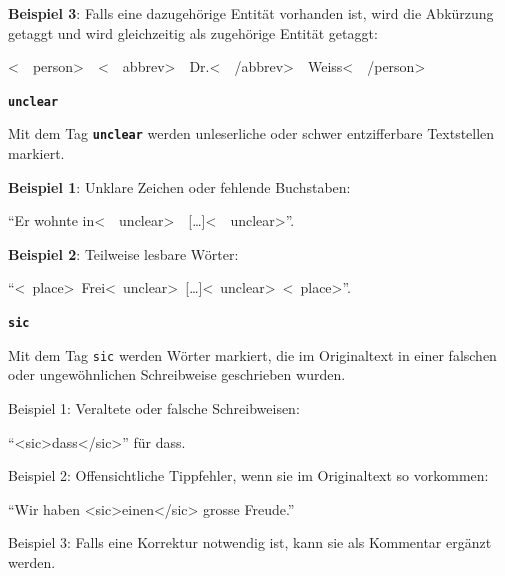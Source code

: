 \documentclass[12pt, a4paper, ngerman, bidi=default]{article}
\begin{document}
\begin{description}
\begin{description}
    \textbf{\textbf{ Beispiel 3}}: Falls eine dazugehörige Entität vorhanden ist, wird die Abkürzung getaggt und wird gleichzeitig als zugehörige Entität getaggt:

    \colorbox{VeryLightGray}{\textless\ \ person\textgreater\ \  \textless\ \  abbrev\textgreater\ \  Dr.\textless\ \  /abbrev\textgreater\ \  Weiss{\textless\ \  /person\textgreater}}
    
    \item\texttt{\textbf{{\colorbox{unclear}{unclear}}}}
    

    Mit dem Tag \texttt{\texttt{\textbf{{\colorbox{unclear}{unclear}}}}} werden unleserliche oder schwer entzifferbare Textstellen markiert.
    
    \noindent\textbf{ Beispiel 1}: Unklare Zeichen oder fehlende Buchstaben: 

    \colorbox{VeryLightGray}{\enquote{Er wohnte in\textless\ \ unclear\textgreater\ \ [\ldots]\textless\ \ unclear\textgreater}.}

    \textbf{ Beispiel 2}: Teilweise lesbare Wörter:

    \colorbox{VeryLightGray}{\enquote{{\textless~place\textgreater~Frei\textless~unclear\textgreater~[\ldots]\textless~unclear\textgreater~\textless~place\textgreater}}.}

    
    \item\texttt{\textbf{{\colorbox{sic}{sic}}}} 

    Mit dem Tag \texttt{sic} werden Wörter markiert, die im Originaltext in einer falschen oder ungewöhnlichen Schreibweise geschrieben wurden.

    \noindent{} Beispiel 1: Veraltete oder falsche Schreibweisen: 

    \colorbox{VeryLightGray}{\enquote{{<sic>dass</sic>}} für dass.}

     Beispiel 2: Offensichtliche Tippfehler, wenn sie im Originaltext so vorkommen: 

    \colorbox{VeryLightGray}{\enquote{Wir haben {<sic>einen</sic>} grosse Freude.}}

     Beispiel 3: Falls eine Korrektur notwendig ist, kann sie als Kommentar ergänzt werden. 

    \end{description}
    \end{description}


    \endgroup
\end{document}

